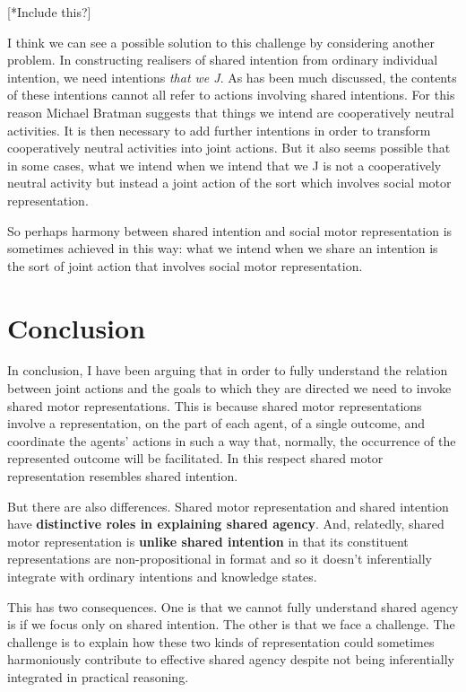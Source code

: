 \documentclass[12pt,\papersize]{extarticle}
\begin{document}
[*Include this?]

I think we can see a possible solution to this challenge by considering another problem.
In constructing realisers of shared intention from ordinary individual intention, we need intentions \emph{that we J}.
As has been much discussed, the contents of these intentions cannot all refer to actions involving shared intentions.
For this reason Michael Bratman suggests that things we intend are  cooperatively neutral activities.
It is then necessary to add further intentions in order to transform cooperatively neutral activities into joint actions.
But it also seems possible that in some cases, what we intend when we intend that we J is not a cooperatively neutral activity but instead a joint action of the sort which involves social motor representation.

So perhaps harmony between shared intention and social motor representation is sometimes achieved in this way: what we intend when we share an intention is the sort of joint action that involves social motor representation.


\section{Conclusion}
In conclusion,
I have been arguing that 
in order to fully understand 
the relation between joint actions and the goals to which they are directed
we need 
to invoke 
shared motor representations.
This is because shared motor representations
involve a representation, on the part of each agent, of a single outcome,
and coordinate the agents' actions in such a way that, normally, the occurrence of the represented outcome will be facilitated.
In this respect shared motor representation resembles shared intention.

But there are also differences.
Shared motor representation
and
shared intention  
have \textbf{distinctive roles in explaining shared agency}.
And, relatedly, shared motor representation is \textbf{unlike shared intention} in that its constituent representations are non-propositional in format and so it doesn't inferentially integrate with ordinary intentions and knowledge states.

This has two consequences.
One is that we cannot fully understand shared agency is if we focus only on shared intention.
The other is that we face a challenge.
The challenge is to explain how these two kinds of representation could sometimes harmoniously contribute to effective shared agency despite not being inferentially integrated in practical reasoning.





\end{document}
